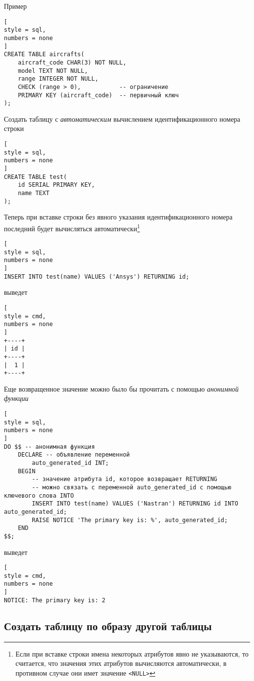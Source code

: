 \documentclass[%
	11pt,
	a4paper,
	utf8,
		]{article}
\begin{document}
Пример
\begin{lstlisting}[
style = sql,
numbers = none
]
CREATE TABLE aircrafts(
    aircraft_code CHAR(3) NOT NULL,
    model TEXT NOT NULL,
    range INTEGER NOT NULL,
    CHECK (range > 0),           -- ограничение
    PRIMARY KEY (aircraft_code)  -- первичный ключ
);
\end{lstlisting}

Создать таблицу с \emph{автоматическим} вычислением идентификационного номера строки
\begin{lstlisting}[
style = sql,
numbers = none
]
CREATE TABLE test(
    id SERIAL PRIMARY KEY,
    name TEXT
);
\end{lstlisting}

Теперь при вставке строки без явного указания идентификационного номера последний будет вычисляться автоматически\footnote{Если при вставке строки имена некоторых атрибутов явно не указываются, то считается, что значения этих атрибутов вычисляются автоматически, в противном случае они имет значение \texttt{<NULL>}}
\begin{lstlisting}[
style = sql,
numbers = none
]
INSERT INTO test(name) VALUES ('Ansys') RETURNING id;
\end{lstlisting}
выведет
\begin{lstlisting}[
style = cmd,
numbers = none
]
+----+
| id |
+----+
|  1 |
+----+
\end{lstlisting}

Еще возвращенное значение можно было бы прочитать с помощью \emph{анонимной функции}
\begin{lstlisting}[
style = sql,
numbers = none
]
DO $$ -- анонимная функция
    DECLARE -- объявление переменной
        auto_generated_id INT;
    BEGIN
        -- значение атрибута id, которое возвращает RETURNING
        -- можно связать с переменной auto_generated_id с помощью ключевого слова INTO
        INSERT INTO test(name) VALUES ('Nastran') RETURNING id INTO auto_generated_id;
        RAISE NOTICE 'The primary key is: %', auto_generated_id;
    END
$$;
\end{lstlisting}
выведет
\begin{lstlisting}[
style = cmd,
numbers = none
]
NOTICE: The primary key is: 2
\end{lstlisting}



\subsection{Создать таблицу по образу другой таблицы}
\end{document}
